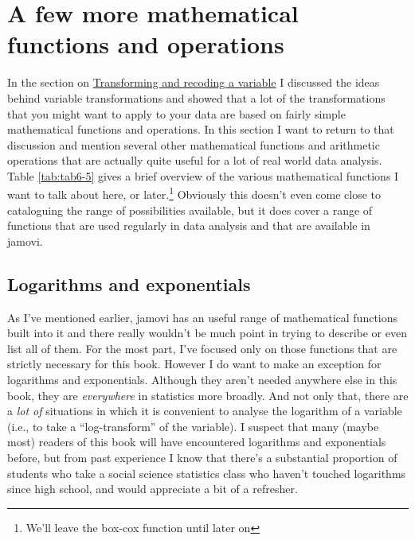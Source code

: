 \documentclass[
]{book}
\begin{document}
\hypertarget{a-few-more-mathematical-functions-and-operations}{%
\section{A few more mathematical functions and operations}\label{a-few-more-mathematical-functions-and-operations}}

In the section on \protect\hyperlink{transforming-and-recoding-a-variable}{Transforming and recoding a variable} I discussed the ideas behind variable transformations and showed that a lot of the transformations that you might want to apply to your data are based on fairly simple mathematical functions and operations. In this section I want to return to that discussion and mention several other mathematical functions and arithmetic operations that are actually quite useful for a lot of real world data analysis. Table \ref{tab:tab6-5} gives a brief overview of the various mathematical functions I want to talk about here, or later.\footnote{We'll leave the box-cox function until later on} Obviously this doesn't even come close to cataloguing the range of possibilities available, but it does cover a range of functions that are used regularly in data analysis and that are available in jamovi.

\hypertarget{logarithms-and-exponentials}{%
\subsection{Logarithms and exponentials}\label{logarithms-and-exponentials}}

As I've mentioned earlier, jamovi has an useful range of mathematical functions built into it and there really wouldn't be much point in trying to describe or even list all of them. For the most part, I've focused only on those functions that are strictly necessary for this book. However I do want to make an exception for logarithms and exponentials. Although they aren't needed anywhere else in this book, they are \emph{everywhere} in statistics more broadly. And not only that, there are a \emph{lot of} situations in which it is convenient to analyse the logarithm of a variable (i.e., to take a ``log-transform'' of the variable). I suspect that many (maybe most) readers of this book will have encountered logarithms and exponentials before, but from past experience I know that there's a substantial proportion of students who take a social science statistics class who haven't touched logarithms since high school, and would appreciate a bit of a refresher.
\end{document}
